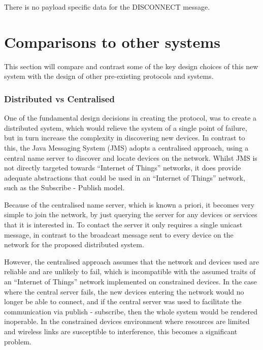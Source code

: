 There is no payload specific data for the DISCONNECT message.



\section{Comparisons to other systems}
This section will compare and contrast some of the key design choices of this new system with the design of other pre-existing protocols and systems. 

\subsubsection{Distributed vs Centralised} %
\label{ssub:distributed_vs_centralised}
One of the fundamental design decisions in creating the protocol, was to create a distributed system, which would relieve the system of a single point of failure, but in turn increase the complexity in discovering new devices. In contrast to this, the Java Messaging System (JMS) adopts a centralised approach, using a central name server to discover and locate devices on the network. Whilst JMS is not directly targeted towards ``Internet of Things'' networks, it does provide adequate abstractions that could be used in an ``Internet of Things'' network, such as the Subscribe - Publish model.

Because of the centralised name server, which is known a priori, it becomes very simple to join the network, by just querying the server for any devices or services that it is interested in.  To contact the server it only requires a single unicast message, in contrast to the broadcast message sent to every device on the network for the proposed distributed system. 

However, the centralised approach assumes that the network and devices used are reliable and are unlikely to fail, which is incompatible with the assumed traits of an ``Internet of Things'' network implemented on constrained devices. In the case where the central server fails, the new devices entering the network would no longer be able to connect, and if the central server was used to facilitate the communication via publish - subscribe, then the whole system would be rendered inoperable. In the constrained devices environment where resources are limited and wireless links are susceptible to interference, this becomes a significant problem.

